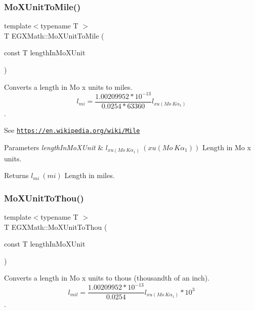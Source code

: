 \subsubsection{\texorpdfstring{Mo\+X\+Unit\+To\+Mile()}{MoXUnitToMile()}}
{\footnotesize\ttfamily template$<$typename T $>$ \\
T E\+G\+X\+Math\+::\+Mo\+X\+Unit\+To\+Mile (\begin{DoxyParamCaption}\item[{const T}]{length\+In\+Mo\+X\+Unit }\end{DoxyParamCaption})}



Converts a length in Mo x units to miles. \[ l_{mi}=\frac{1.00209952*10^{-13}}{0.0254 * 63360} l_{xu(Mo\ K\alpha_1)} \]. 

See \href{https://en.wikipedia.org/wiki/Mile}{\tt https\+://en.\+wikipedia.\+org/wiki/\+Mile} 
\begin{DoxyParams}{Parameters}
{\em length\+In\+Mo\+X\+Unit} & $ l_{xu(Mo\ K\alpha_1)}\ (xu(Mo\ K\alpha_1))$ Length in Mo x units. \\
\hline
\end{DoxyParams}
\begin{DoxyReturn}{Returns}
$ l_{mi}\ (mi)$ Length in miles. 
\end{DoxyReturn}
\mbox{\label{group___e_g_x_math-_conversions-_length_conversions-_non-_s_i-_mo_x_unit-_imperial_gae18fc1fb7d5238fe185b85084b95b2b0}} 
\subsubsection{\texorpdfstring{Mo\+X\+Unit\+To\+Thou()}{MoXUnitToThou()}}
{\footnotesize\ttfamily template$<$typename T $>$ \\
T E\+G\+X\+Math\+::\+Mo\+X\+Unit\+To\+Thou (\begin{DoxyParamCaption}\item[{const T}]{length\+In\+Mo\+X\+Unit }\end{DoxyParamCaption})}



Converts a length in Mo x units to thous (thousandth of an inch). \[ l_{mil}= \frac{1.00209952*10^{-13}}{0.0254} l_{xu(Mo\ K\alpha_1)} * 10^{3} \]. 

